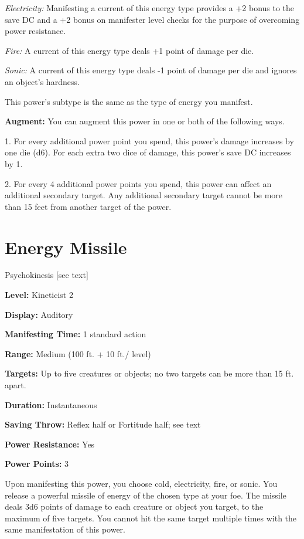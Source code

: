 \documentclass{article}
\begin{document}
\textit{Electricity: }Manifesting a current of this energy type provides a +2 bonus 
to the save DC and a +2 bonus on manifester level checks for the purpose of overcoming 
power resistance.

\textit{Fire: }A current of this energy type deals +1 point of damage per die.

\textit{Sonic: }A current of this energy type deals -1 point of damage per die 
and ignores an object's hardness.

This power's subtype is the same as the type of energy you manifest.

\textbf{Augment:} You can augment this power in one or both of the following ways.

1. For every additional power point you spend, this power's damage increases by 
one die (d6). For each extra two dice of damage, this power's save DC increases 
by 1.

2. For every 4 additional power points you spend, this power can affect an additional 
secondary target. Any additional secondary target cannot be more than 15 feet from 
another target of the power.

\vspace{12pt}
\section*{Energy Missile}

Psychokinesis [see text]

\textbf{Level:} Kineticist 2

\textbf{Display:} Auditory

\textbf{Manifesting Time:} 1 standard action

\textbf{Range:} Medium (100 ft. + 10 ft./ level)

\textbf{Targets:} Up to five creatures or objects; no two targets can be more than 
15 ft. apart.

\textbf{Duration:} Instantaneous

\textbf{Saving Throw:} Reflex half or Fortitude half; see text

\textbf{Power Resistance:} Yes

\textbf{Power Points:} 3

Upon manifesting this power, you choose cold, electricity, fire, or sonic. You 
release a powerful missile of energy of the chosen type at your foe. The missile 
deals 3d6 points of damage to each creature or object you target, to the maximum 
of five targets. You cannot hit the same target multiple times with the same manifestation 
of this power.
\end{document}
